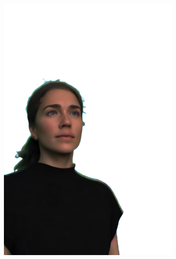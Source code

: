 \begin{figure}[ht]
\begin{subfigure}{0.08\linewidth}
        \includegraphics[width=\textwidth]{Figures/results/low/irene_3d/11_render.png}

\end{subfigure}
\end{figure}
